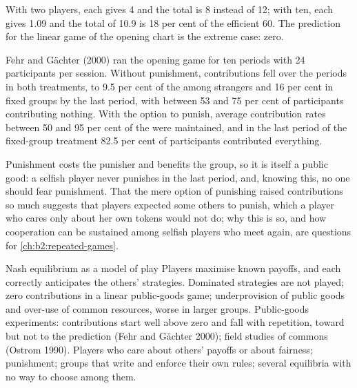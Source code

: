 With two players, each gives 4 and the total is 8 instead of 12; with ten, each gives 1.09 and the total of 10.9 is
18 per cent of the efficient 60. The prediction for the linear game of the opening chart is the extreme case:
zero.

\begin{record}[Contributions fall with repetition]
Fehr and G\"achter (2000) ran the opening game for ten periods with 24 participants per session. Without
punishment, contributions fell over the periods in both treatments, to 9.5 per cent of the  among
strangers and 16 per cent in fixed groups by the last period, with between 53 and 75 per cent of
participants contributing nothing. With the option to punish, average contribution rates between 50 and
95 per cent of the  were maintained, and in the last period of the fixed-group treatment 82.5 per
cent of participants contributed everything.
\end{record}

Punishment costs the punisher and benefits the group, so it is itself a public good: a selfish player
never punishes in the last period, and, knowing this, no one should fear punishment. That the mere option of
punishing raised contributions so much suggests that players expected some others to punish, which a player
who cares only about her own tokens would not do; why this is so, and how cooperation can be
sustained among selfish players who meet again, are questions for \cref{ch:b2:repeated-games}.

\begin{model}{Nash equilibrium as a model of play}
\assumes Players maximise known payoffs, and each correctly anticipates the others' strategies.
\predicts Dominated strategies are not played; zero contributions in a linear public-goods game;
underprovision of public goods and over-use of common resources, worse in larger groups.
\tested Public-goods experiments: contributions start well above zero and fall with repetition, toward
but not to the prediction (Fehr and G\"achter 2000); field studies of commons (Ostrom 1990).
\breaks Players who care about others' payoffs or about fairness; punishment; groups that write and enforce
their own rules; several equilibria with no way to choose among them.
\end{model}

